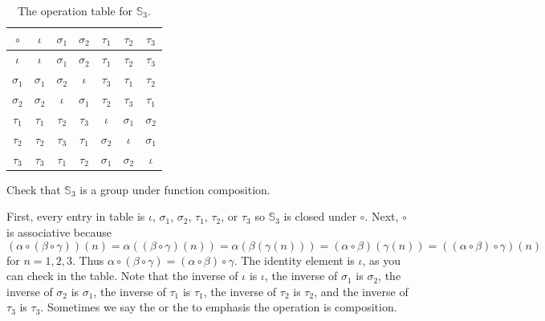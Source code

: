 \begin{exam}
\begin{apart}
\begin{soln}
                        \begin{table}[hbtp]
                            \centering
                            \begin{tabular}{c|cccccc} 
                                 $\circ$ & $\iota$ & $\sigma_1$ & $\sigma_2$ & $\tau_1$ & $\tau_2$ & $\tau_3$ \\ \hline
                                 $\iota$ & $\iota$ & $\sigma_1$ & $\sigma_2$ & $\tau_1$ & $\tau_2$ & $\tau_3$ \\
                                 $\sigma_1$ & $\sigma_1$ & $\sigma_2$ & $\iota$ & $\tau_3$ & $\tau_1$ & $\tau_2$\\
                                 $\sigma_2$ & $\sigma_2$ & $\iota$ & $\sigma_1$ & $\tau_2$ & $\tau_3$ & $\tau_1$ \\
                                 $\tau_1$ & $\tau_1$ & $\tau_2$ & $\tau_3$ & $\iota$ & $\sigma_1$ & $\sigma_2$\\
                                 $\tau_2$ & $\tau_2$ & $\tau_3$ & $\tau_1$ & $\sigma_2$ & $\iota$ & $\sigma_1$ \\
                                 $\tau_3$ & $\tau_3$ & $\tau_1$ & $\tau_2$ & $\sigma_1$ & $\sigma_2$ & $\iota$\\
                            \end{tabular}
                            \caption{The operation table for $\mathbb{S}_3$.}
                            \label{tab_sym3}
                        \end{table}

                \end{soln}
            \item Check that $\mathbb{S}_3$ is a group under function composition.
                \begin{soln}
                    First, every entry in table is $\iota$, $\sigma_1$, $\sigma_2$, $\tau_1$, $\tau_2$, or $\tau_3$ so $\mathbb{S}_3$ is closed under $\circ$.  Next, $\circ$ is associative because 
                        $$(\alpha \circ (\beta \circ \gamma)) (n)
                        = \alpha((\beta \circ \gamma)(n))
                        = \alpha(\beta(\gamma(n)))
                        =  (\alpha \circ \beta) (\gamma(n)) 
                        = ((\alpha \circ \beta ) \circ \gamma) (n)$$ 
                    for $n=1,2,3$. Thus $\alpha \circ (\beta \circ \gamma)= (\alpha \circ \beta ) \circ \gamma$.  The identity element is $\iota$, as you can check in the table.  Note that the inverse of $\iota$ is $\iota$, the inverse of $\sigma_1$ is $\sigma_2$, the inverse of $\sigma_2$ is $\sigma_1$, the inverse of $\tau_1$ is $\tau_1$, the inverse of $\tau_2$ is $\tau_2$, and the inverse of $\tau_3$ is $\tau_3$.  Sometimes we say the  or the  to emphasis the operation is composition.
                \end{soln}
        \end{apart}
\end{exam}


